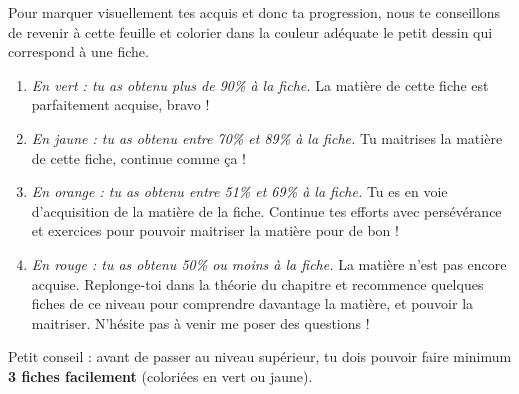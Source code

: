 \documentclass[12pt,parskip=half-, twoside=semi]{scrartcl}
\begin{document}
\vfill

Pour marquer visuellement tes acquis et donc ta progression, nous te conseillons de revenir à cette feuille et colorier dans la couleur adéquate le petit dessin  qui correspond à une fiche.

\begin{enumerate}[itemsep=1cm]
  \item \emph{En vert : tu as obtenu plus de 90\% à la fiche. } La matière de cette fiche est parfaitement acquise, bravo !
  \item \emph{En jaune : tu as obtenu entre 70\% et 89\% à la fiche. } Tu maitrises la matière de cette fiche, continue comme ça ! 
  \item \emph{En orange : tu as obtenu entre 51\% et 69\% à la fiche. } Tu es en voie d'acquisition de la matière de la fiche. Continue tes efforts avec persévérance et exercices pour pouvoir maitriser la matière pour de bon ! 
  \item \emph{En rouge : tu as obtenu 50\% ou moins à la fiche. } La matière n'est pas encore acquise. Replonge-toi dans la théorie du chapitre et recommence quelques fiches de ce niveau pour comprendre davantage la matière, et pouvoir la maitriser. N'hésite pas à venir me poser des questions !
\end{enumerate}

\vfill

Petit conseil : avant de passer au niveau supérieur, tu dois pouvoir faire minimum \textbf{3 fiches facilement} (coloriées en vert ou jaune). 
\end{document}
